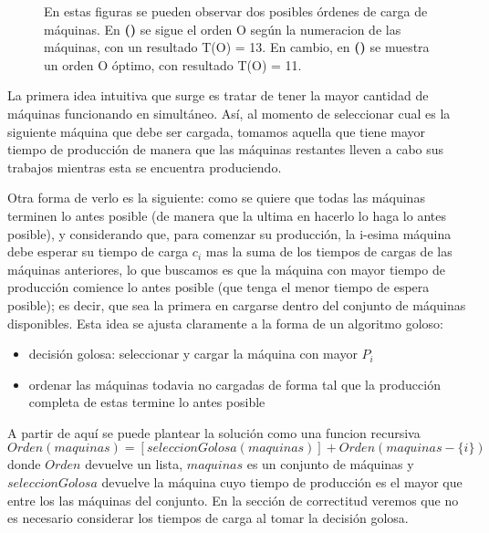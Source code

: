 \begin{figure}
\begin{center}
\begin{minipage}[c]{\figurewidth}
\begin{center}
             \caption{En estas figuras se pueden observar dos posibles \'ordenes de carga de m\'aquinas. En \textbf{()} se
             					sigue el orden O seg\'un la numeracion de las m\'aquinas, con un resultado T(O) = 13. En cambio, en \textbf{()} 
             					se muestra un orden O \'optimo, con resultado T(O) = 11.
             					}   
             \label{fig:ej1Ejemplos}
            \end{center}
        \end{minipage}
    \end{center}
\end{figure}
 
 
La primera idea intuitiva que surge es tratar de tener la mayor cantidad de m\'aquinas funcionando en simult\'aneo.
As\'i, al momento de seleccionar cual es la siguiente m\'aquina que debe ser cargada, 
tomamos aquella que tiene mayor tiempo de producci\'on de manera
que las m\'aquinas restantes lleven a cabo sus trabajos mientras esta se encuentra produciendo.

Otra forma de verlo es la siguiente: como se quiere que todas las m\'aquinas terminen lo antes posible (de manera que la ultima en hacerlo lo haga lo antes posible), y considerando
que, para comenzar su producci\'on, la i-esima m\'aquina debe esperar su tiempo de carga $c_i$ mas la suma de los tiempos de cargas de las m\'aquinas anteriores,
lo que buscamos es que la m\'aquina con mayor tiempo de producci\'on comience lo antes posible (que tenga el menor tiempo de espera posible); es decir, que sea la primera en cargarse dentro del conjunto de m\'aquinas disponibles. Esta idea se ajusta claramente a la forma de un algoritmo goloso:
\begin{itemize}
	\item decisi\'on golosa: seleccionar y cargar la m\'aquina con mayor $P_i$
	\item ordenar las m\'aquinas todavia no cargadas de forma tal que la producci\'on completa de estas termine lo antes posible
\end{itemize}
A partir de aqu\'i se puede plantear la soluci\'on como una funcion recursiva
$$ Orden(maquinas) = [seleccionGolosa(maquinas)] + Orden(maquinas - \{i\})$$
donde $Orden$ devuelve un lista, $maquinas$ es un conjunto de m\'aquinas y $seleccionGolosa$ devuelve la m\'aquina cuyo tiempo de producci\'on es el mayor que entre los  las m\'aquinas del conjunto. En la secci\'on de correctitud veremos que  no es necesario considerar los tiempos de carga al tomar la decisi\'on golosa.

